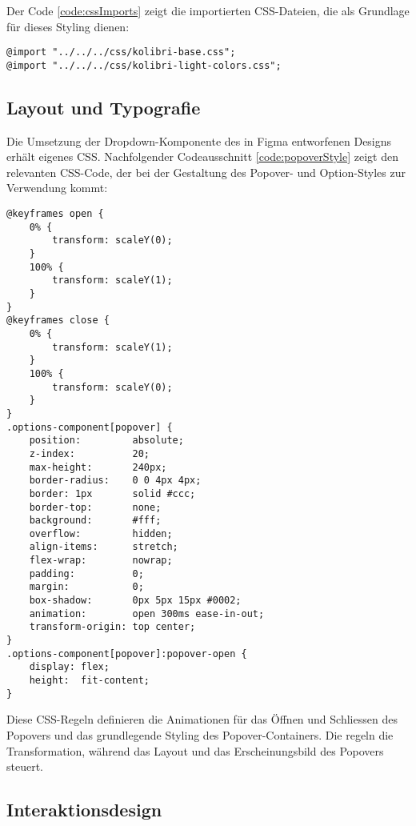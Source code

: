 \noindent
Der Code \ref{code:cssImports} zeigt die importierten CSS-Dateien, die als Grundlage für dieses Styling dienen:

\begin{lstlisting}[style = htmlcssjs, caption = CSS Imports, label = code:cssImports]
@import "../../../css/kolibri-base.css";
@import "../../../css/kolibri-light-colors.css";
\end{lstlisting}


\subsection{Layout und Typografie}
\label{sec:layoutTypo}

Die Umsetzung der Dropdown-Komponente des in Figma entworfenen Designs erhält eigenes CSS.
Nachfolgender Codeausschnitt \ref{code:popoverStyle} zeigt den relevanten CSS-Code, der bei der Gestaltung des Popover- und Option-Styles zur Verwendung kommt:

\begin{lstlisting}[style = htmlcssjs, caption = CSS für das Popover-Element, label = code:popoverStyle]
@keyframes open {
    0% {
        transform: scaleY(0);
    }
    100% {
        transform: scaleY(1);
    }
}
@keyframes close {
    0% {
        transform: scaleY(1);
    }
    100% {
        transform: scaleY(0);
    }
}
.options-component[popover] {
    position:         absolute;
    z-index:          20;
    max-height:       240px;
    border-radius:    0 0 4px 4px;
    border: 1px       solid #ccc;
    border-top:       none;
    background:       #fff;
    overflow:         hidden;
    align-items:      stretch;
    flex-wrap:        nowrap;
    padding:          0;
    margin:           0;
    box-shadow:       0px 5px 15px #0002;
    animation:        open 300ms ease-in-out;
    transform-origin: top center;
}
.options-component[popover]:popover-open {
    display: flex;
    height:  fit-content;
} 
\end{lstlisting}

Diese CSS-Regeln definieren die Animationen für das Öffnen und Schliessen des Popovers und das grundlegende Styling des Popover-Containers.
Die  regeln die Transformation, während  das Layout und das Erscheinungsbild des Popovers steuert.


\subsection{Interaktionsdesign} %
\label{sec:interactionDesign}


